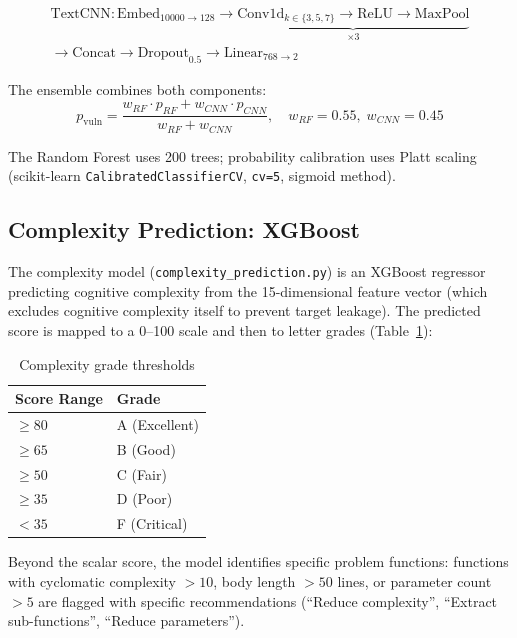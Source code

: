 \documentclass[12pt, oneside]{report}
\begin{document}
\begin{multline}
  \text{TextCNN}: \text{Embed}_{10000 \to 128} \to
  \underbrace{\text{Conv1d}_{k \in \{3,5,7\}} \to \text{ReLU} \to \text{MaxPool}}_{\times 3} \\
  \to \text{Concat} \to \text{Dropout}_{0.5} \to \text{Linear}_{768 \to 2}
\end{multline}

The ensemble combines both components:
\begin{equation}
  p_{\text{vuln}} = \frac{w_{RF} \cdot p_{RF} + w_{CNN} \cdot p_{CNN}}{w_{RF} + w_{CNN}},
  \quad w_{RF} = 0.55,\; w_{CNN} = 0.45
\end{equation}

The Random Forest uses 200 trees; probability calibration uses Platt scaling
(scikit-learn \texttt{CalibratedClassifierCV}, \texttt{cv=5}, sigmoid method).

\subsection{Complexity Prediction: XGBoost}
\label{ssec:complexity}

The complexity model (\texttt{complexity\_prediction.py}) is an XGBoost regressor
predicting cognitive complexity from the 15-dimensional feature vector (which excludes
cognitive complexity itself to prevent target leakage). The predicted score is mapped
to a 0--100 scale and then to letter grades (Table~\ref{tab:grades}):

\begin{table}[H]
\centering
\caption{Complexity grade thresholds}
\label{tab:grades}
\begin{tabular}{@{}ll@{}}
\toprule
\textbf{Score Range} & \textbf{Grade} \\
\midrule
$\geq 80$ & A (Excellent) \\
$\geq 65$ & B (Good) \\
$\geq 50$ & C (Fair) \\
$\geq 35$ & D (Poor) \\
$< 35$ & F (Critical) \\
\bottomrule
\end{tabular}
\end{table}

Beyond the scalar score, the model identifies specific problem functions: functions
with cyclomatic complexity $> 10$, body length $> 50$ lines, or parameter count $> 5$
are flagged with specific recommendations (``Reduce complexity'', ``Extract sub-functions'',
``Reduce parameters'').
\end{document}
